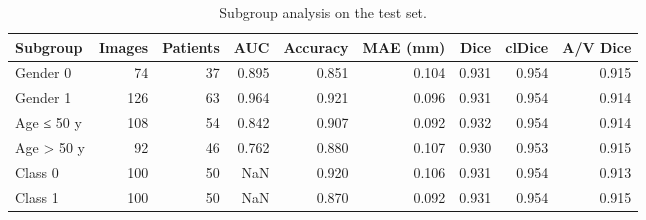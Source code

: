 \begin{table}
\caption{Subgroup analysis on the test set.}
\label{tab:subgroup_analysis}
\begin{tabular}{lrrrrrrrr}
\toprule
Subgroup & Images & Patients & AUC & Accuracy & MAE (mm) & Dice & clDice & A/V Dice \\
\midrule
Gender 0 & 74 & 37 & 0.895 & 0.851 & 0.104 & 0.931 & 0.954 & 0.915 \\
Gender 1 & 126 & 63 & 0.964 & 0.921 & 0.096 & 0.931 & 0.954 & 0.914 \\
Age ≤ 50 y & 108 & 54 & 0.842 & 0.907 & 0.092 & 0.932 & 0.954 & 0.914 \\
Age > 50 y & 92 & 46 & 0.762 & 0.880 & 0.107 & 0.930 & 0.953 & 0.915 \\
Class 0 & 100 & 50 & NaN & 0.920 & 0.106 & 0.931 & 0.954 & 0.913 \\
Class 1 & 100 & 50 & NaN & 0.870 & 0.092 & 0.931 & 0.954 & 0.915 \\
\bottomrule
\end{tabular}
\end{table}
